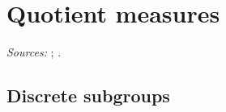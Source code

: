 
\chapter{Quotient measures}\label{ch:ch-0-07-quotient}

\noindent\emph{Sources:} \cite[§1]{AIntro}; \cite[§1]{A-R1}.

\section{Discrete subgroups}

